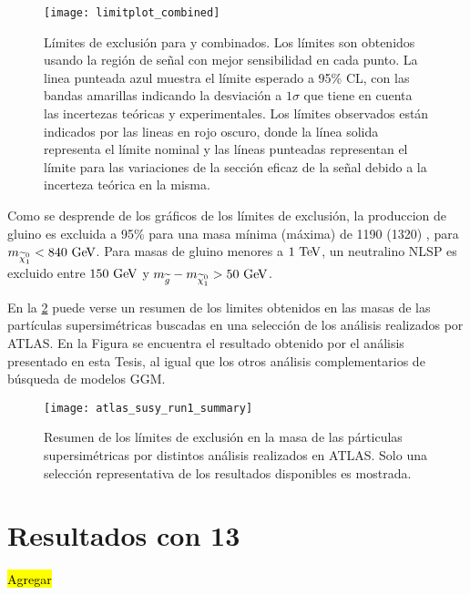 \begin{figure}[!htbp]
  \centering

  \texttt{[image: limitplot\_combined]}

  \caption{Límites de exclusión para {\SRL} y {\SRH} combinados.
    Los límites son obtenidos usando la región de señal con mejor sensibilidad
    en cada punto.
    La linea punteada azul muestra el límite esperado a 95\% CL, con las bandas amarillas indicando la desviación a
    $1\sigma$ que tiene en cuenta las incertezas teóricas y experimentales. Los
    límites observados están indicados por las lineas en rojo oscuro, donde la línea
    solida representa el límite nominal y las líneas punteadas representan el límite
    para las variaciones de la sección eficaz de la señal debido a la incerteza
    teórica en la misma.}
   \label{fig:limit_combined}

\end{figure}


Como se desprende de los gráficos de los límites de exclusión, la produccion de
gluino es excluida a 95\% {\cl} para una masa mínima (máxima) de 1190 (1320)
\gev, para $m_{\ninoone}<{840}\gev$. Para masas de gluino menores a $1\tev$, un
neutralino NLSP es excluido entre $150\gev$ y $m_{\gluino}-m_{\ninoone}>50\gev$.

En la \cref{fig:susy_summary} puede verse un resumen de los limites obtenidos en
las masas de las partículas supersimétricas buscadas en una selección de los
análisis realizados por ATLAS. En la Figura se encuentra el resultado obtenido
por el análisis presentado en esta Tesis, al igual que los otros análisis
complementarios de búsqueda de modelos GGM.


\begin{figure}[!htbp]
  \centering

  \texttt{[image: atlas\_susy\_run1\_summary]}

  \caption{Resumen de los límites de exclusión en la masa de las párticulas
    supersimétricas por distintos análisis realizados en ATLAS. Solo una
    selección representativa de los resultados disponibles es
    mostrada\cite{susy_summary}.}
  \label{fig:susy_summary}

\end{figure}


\section{Resultados con 13 \tev}

\hl{Agregar}
